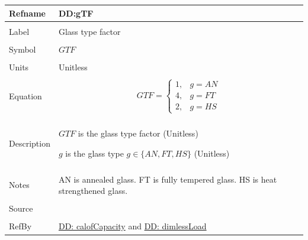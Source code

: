 \documentclass[12pt]{article}
\begin{document}
\noindent \begin{minipage}{\textwidth}
\begin{tabular}{p{} p{}}
\toprule \textbf{Refname} & \textbf{DD:gTF}
\label{DD:gTF}
\\ \midrule \\
Label & Glass type factor
\\ \midrule \\
Symbol & $GTF$
\\ \midrule \\
Units & Unitless
\\ \midrule \\
Equation & \begin{displaymath}
           GTF=\begin{cases}
1, & g=AN\\
4, & g=FT\\
2, & g=HS
\end{cases}
           \end{displaymath}
\\ \midrule \\
Description & \begin{symbDescription}
              \item{$GTF$ is the glass type factor (Unitless)}
              \item{$g$ is the glass type $g\in{}\{AN,FT,HS\}$ (Unitless)}
              \end{symbDescription}
\\ \midrule \\
Notes & AN is annealed glass.
        FT is fully tempered glass.
        HS is heat strengthened glass.
\\ \midrule \\
Source & \cite{astm2009}
\\ \midrule \\
RefBy & \hyperref[DD:calofCapacity]{DD: calofCapacity} and \hyperref[DD:dimlessLoad]{DD: dimlessLoad}
\\ \bottomrule \end{tabular}
\end{minipage}
\par~
\end{document}

